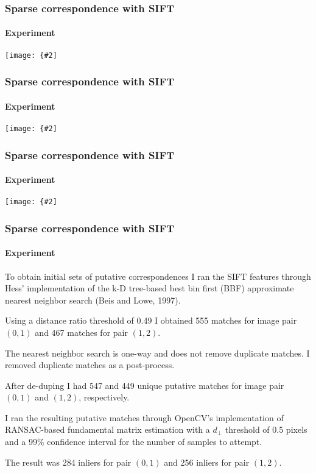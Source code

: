 \documentclass[aspectratio=169]{beamer}
\newcommand{\myfig}[3]{\centerline{\texttt{[image: \{\#2]}}}
    \centerline{\scriptsize #3}}
\begin{document}
\begin{frame}
\frametitle{Sparse correspondence with SIFT}
\framesubtitle{Experiment}

\myfig{3.5in}{Golf0-sift}{AIT golf course image 0 with 3062 SIFT
  features detected.}

\end{frame}


\begin{frame}
\frametitle{Sparse correspondence with SIFT}
\framesubtitle{Experiment}

\myfig{3.5in}{Golf1-sift}{AIT golf course image 1 with 2993 SIFT
  features detected.}

\end{frame}


\begin{frame}
\frametitle{Sparse correspondence with SIFT}
\framesubtitle{Experiment}

\myfig{3.5in}{Golf2-sift}{AIT golf course image 2 with 3042 SIFT
  features detected.}

\end{frame}


\begin{frame}
\frametitle{Sparse correspondence with SIFT}
\framesubtitle{Experiment}

To obtain initial sets of putative correspondences I ran the SIFT
features through Hess' implementation of the k-D tree-based best bin
first (BBF) approximate nearest neighbor search (Beis and Lowe, 1997).

\medskip

Using a distance ratio threshold of 0.49 I obtained 555 matches for
image pair $(0,1)$ and 467 matches for pair $(1,2)$.

\medskip

The nearest neighbor search is one-way and does not remove duplicate
matches.  I removed duplicate matches as a post-process.

\medskip

After de-duping I had 547 and 449 unique putative matches for image
pair $(0,1)$ and $(1,2)$, respectively.

\medskip

I ran the resulting putative matches through OpenCV's implementation
of RANSAC-based fundamental matrix estimation with a $d_{\perp}$
threshold of 0.5 pixels and a 99\% confidence interval for the number
of samples to attempt.

\medskip

The result was 284 inliers for pair $(0,1)$ and 256 inliers for
pair $(1,2)$.

\end{frame}
\end{document}
